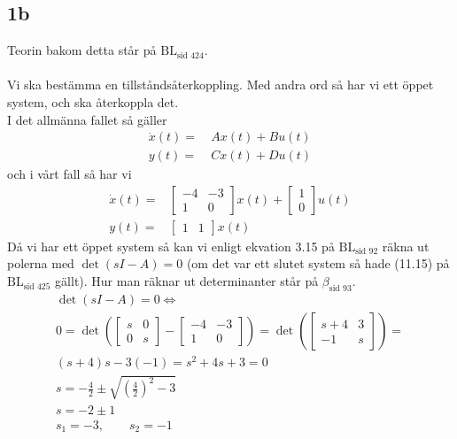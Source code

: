 \documentclass[a4paper]{article}
\newcommand{\mhb}[1]{$\beta_{\text{#1}}$}     %
\newcommand{\bl}[1]{$\text{BL}_{\text{#1}}$}  %
\begin{document}
\subsection{1b}
Teorin bakom detta står på \bl{sid 424}.\\\\
%
Vi ska bestämma en tillståndsåterkoppling. Med andra ord så har vi ett öppet system, och ska återkoppla det.\\
%
I det allmänna fallet så gäller
\begin{align*}
  \dot{x}(t) =~& Ax(t) + Bu(t) \\
  y(t) =~& Cx(t) + Du(t)
\end{align*}
och i vårt fall så har vi
\begin{align*}
  \dot{x}(t) =& \begin{bmatrix}-4 & -3 \\ 1 & 0\end{bmatrix} x(t) + \begin{bmatrix}1 \\ 0\end{bmatrix} u(t) \\
  y(t) =& \begin{bmatrix}1 & 1\end{bmatrix} x(t)
\end{align*}
%
%
Då vi har ett öppet system så kan vi enligt ekvation 3.15 på \bl{sid 92} räkna ut polerna med $\det(sI-A) = 0$ (om det var ett slutet system så hade (11.15) på \bl{sid 425} gällt). Hur man räknar ut determinanter står på \mhb{sid 93}.
%
\begin{align*}
  \det(sI-A) = 0 \Longleftrightarrow \\
  0 = \det \left( \begin{bmatrix}s & 0 \\ 0 & s\end{bmatrix} - \begin{bmatrix}-4 & -3 \\ 1 & 0\end{bmatrix} \right) = \det \left( \begin{bmatrix}s+4 & 3 \\ -1 & s\end{bmatrix} \right) =\\
  (s+4)s - 3(-1) = s^2 + 4s + 3 = 0\\
  s=-\frac{4}{2} \pm \sqrt{\left(\frac{4}{2}\right)^2 - 3}\\
  s=-2 \pm 1\\
  s_1=-3, \qquad s_2=-1\\
\end{align*}
\end{document}
